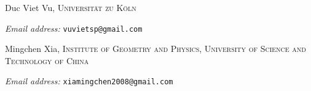 \documentclass[11pt,a4paper]{amsart}
\theoremstyle{definition}
\begin{document}
\printbibliography

\bigskip
\noindent Duc Viet Vu, \textsc{Universit\"at zu K\"oln}\par\nopagebreak
\noindent\textit{Email address:} \texttt{vuvietsp@gmail.com}

\medskip
\noindent Mingchen Xia, \textsc{Institute of Geometry and Physics,
University of Science and Technology of China}\par\nopagebreak
\noindent\textit{Email address:} \texttt{xiamingchen2008@gmail.com}
\end{document}

